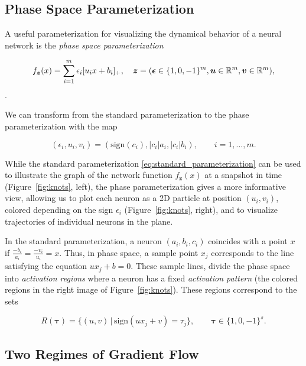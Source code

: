 \subsection{Phase Space Parameterization}

A useful parameterization for visualizing the dynamical behavior of a neural network is the \emph{phase space parameterization}

\begin{equation}
    f_{\bm z}(x) = \sum_{i=1}^m \epsilon_i [u_i x + b_i]_+, \quad \bm z = (\bm \epsilon \in \{1, 0, -1\}^m, \bm u \in \mathbb{R}^m, \bm v \in \mathbb{R}^m),
\end{equation}.

We can transform from the standard parameterization to the phase parameterization with the map 

\begin{equation}\label{eq:reduced_params}
(\epsilon_i, u_i,v_i) = (\text{sign}(c_i), |c_i|a_i,|c_i| b_i), \qquad i=1,\ldots,m.
\end{equation}

While the standard parameterization \eqref{eq:standard_parameterization} can be used to illustrate the graph of the network function $f_{\bm z}(x)$ at a snapshot in time (Figure~\ref{fig:knots}, left), the phase parameterization gives a more informative view, allowing us to plot each neuron as a 2D particle at position $(u_i,v_i)$, colored depending on the sign $\epsilon_i$ (Figure~\ref{fig:knots}, right), and to visualize trajectories of individual neurons in the plane. 

In the standard parameterization, a neuron $(a_i, b_i, c_i)$ coincides with a point $x$ if $\frac{-b_i}{a_i} = \frac{-v_i}{u_i} = x$. Thus, in phase space, a sample point $x_j$ corresponds to the line satisfying the equation $u x_j + b = 0$. These sample lines, divide the phase space into \emph{activation regions} where a neuron has a fixed \emph{activation pattern} (the colored regions in the right image of Figure~\ref{fig:knots}). These regions correspond to the sets

\begin{equation}\label{eq:activatioon_region}
    R(\bm \tau) = \{ (u, v) \, | \, \text{sign}(u x_j + v) = \tau_j \}, \qquad \bm \tau \in \{1, 0, -1\}^s.
\end{equation}


\subsection{Two Regimes of Gradient Flow}

